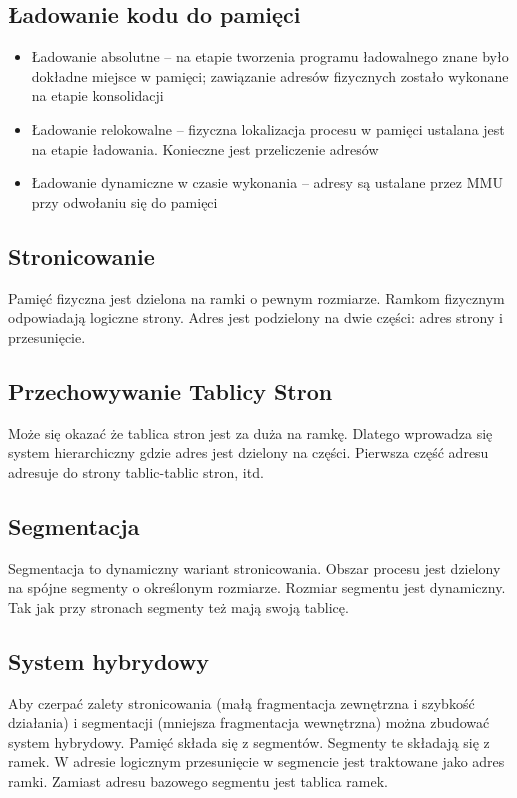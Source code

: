 \documentclass{../notatki}
\begin{document}
\subsection{Ładowanie kodu do pamięci}

\begin{itemize}
  \item Ładowanie absolutne – na etapie tworzenia programu
    ładowalnego znane było dokładne miejsce w pamięci; zawiązanie
    adresów fizycznych zostało wykonane na etapie konsolidacji
  \item Ładowanie relokowalne – fizyczna lokalizacja procesu w
    pamięci ustalana jest na etapie ładowania. Konieczne jest
    przeliczenie adresów
  \item Ładowanie dynamiczne w czasie wykonania – adresy są ustalane
    przez MMU przy odwołaniu się do pamięci
\end{itemize}

\subsection{Stronicowanie}

Pamięć fizyczna jest dzielona na ramki o pewnym rozmiarze. Ramkom
fizycznym odpowiadają logiczne strony. Adres jest podzielony na dwie
części: adres strony i przesunięcie.

\subsection{Przechowywanie Tablicy Stron}

Może się okazać że tablica stron jest za duża na ramkę. Dlatego
wprowadza się system hierarchiczny gdzie adres jest dzielony na części.
Pierwsza część adresu adresuje do strony tablic-tablic stron, itd.

\subsection{Segmentacja}

Segmentacja to dynamiczny wariant stronicowania. Obszar procesu jest
dzielony na spójne segmenty o określonym rozmiarze. Rozmiar segmentu
jest dynamiczny. Tak jak przy stronach segmenty też mają swoją tablicę.

\subsection{System hybrydowy}

Aby czerpać zalety stronicowania (małą fragmentacja zewnętrzna i
szybkość działania) i segmentacji (mniejsza fragmentacja wewnętrzna)
można zbudować system hybrydowy. Pamięć składa się z segmentów.
Segmenty te składają się z ramek. W adresie logicznym przesunięcie w
segmencie jest traktowane jako adres ramki. Zamiast adresu bazowego
segmentu jest tablica ramek.
\end{document}
